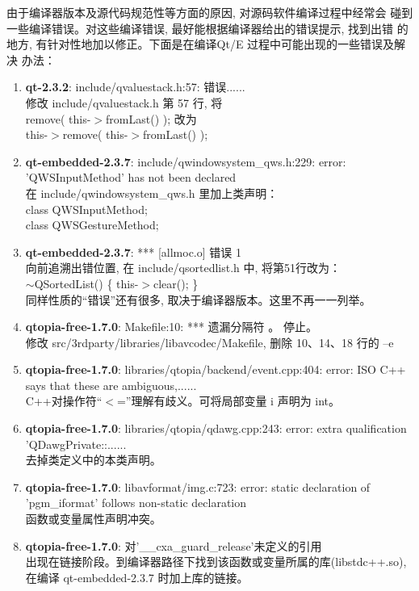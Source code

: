 由于编译器版本及源代码规范性等方面的原因, 对源码软件编译过程中经常会
碰到一些编译错误。对这些编译错误, 最好能根据编译器给出的错误提示, 找到出错
的地方, 有针对性地加以修正。下面是在编译Qt/E 过程中可能出现的一些错误及解决
办法：
\begin{enumerate}
  \item {\bf qt-2.3.2}: include/qvaluestack.h:57: 错误......\\
		修改 include/qvaluestack.h 第 57 行, 将\\
		remove( this-$>$fromLast() ); 改为\\
		this-$>$remove( this-$>$fromLast() );
  \item {\bf qt-embedded-2.3.7}: include/qwindowsystem\_qws.h:229: error:
		'QWSInputMethod' has not been declared\\
		在 include/qwindowsystem\_qws.h 里加上类声明：\\
		class   QWSInputMethod;\\
		class   QWSGestureMethod;
  \item {\bf qt-embedded-2.3.7}: *** [allmoc.o] 错误 1\\
		向前追溯出错位置, 在 include/qsortedlist.h 中, 将第51行改为：\\
		$\sim$QSortedList() \{ this-$>$clear(); \}\\
		同样性质的``错误''还有很多, 取决于编译器版本。这里不再一一列举。
  \item {\bf qtopia-free-1.7.0}: Makefile:10: *** 遗漏分隔符 。 停止。\\
		修改 src/3rdparty/libraries/libavcodec/Makefile, 删除 10、14、18
		行的 --e
  \item {\bf qtopia-free-1.7.0}: libraries/qtopia/backend/event.cpp:404:
		error: ISO C++ says that these are ambiguous,......\\
		C++对操作符``$<$=''理解有歧义。可将局部变量 i 声明为 int。
  \item {\bf qtopia-free-1.7.0}: libraries/qtopia/qdawg.cpp:243: error:
		extra qualification 'QDawgPrivate::......\\
		去掉类定义中的本类声明。
  \item {\bf qtopia-free-1.7.0}: libavformat/img.c:723: error: static
		declaration of 'pgm\_iformat' follows non-static declaration\\
		函数或变量属性声明冲突。
  \item {\bf qtopia-free-1.7.0}: 对'\_\_cxa\_guard\_release'未定义的引用\\
		出现在链接阶段。到编译器路径下找到该函数或变量所属的库(libstdc++.so),
		在编译 qt-embedded-2.3.7 时加上库的链接。
\end{enumerate}
\rm
